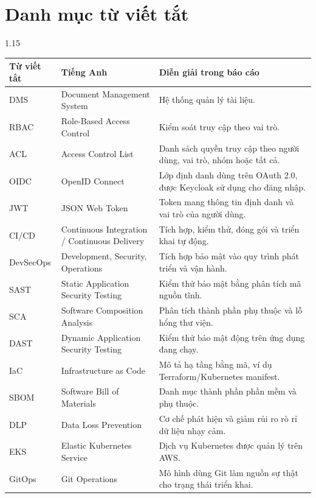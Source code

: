 \chapter*{Danh mục từ viết tắt}

\begin{spacing}{1.15}
\small
\begingroup
\renewcommand{\arraystretch}{1.22}
\begin{longtable}{p{}p{}p{}}
\toprule
\textbf{Từ viết tắt} & \textbf{Tiếng Anh} & \textbf{Diễn giải trong báo cáo} \\
\midrule
DMS & Document Management System & Hệ thống quản lý tài liệu. \\
RBAC & Role-Based Access Control & Kiểm soát truy cập theo vai trò. \\
ACL & Access Control List & Danh sách quyền truy cập theo người dùng, vai trò, nhóm hoặc tất cả. \\
OIDC & OpenID Connect & Lớp định danh dùng trên OAuth 2.0, được Keycloak sử dụng cho đăng nhập. \\
JWT & JSON Web Token & Token mang thông tin định danh và vai trò của người dùng. \\
CI/CD & Continuous Integration / Continuous Delivery & Tích hợp, kiểm thử, đóng gói và triển khai tự động. \\
DevSecOps & Development, Security, Operations & Tích hợp bảo mật vào quy trình phát triển và vận hành. \\
SAST & Static Application Security Testing & Kiểm thử bảo mật bằng phân tích mã nguồn tĩnh. \\
SCA & Software Composition Analysis & Phân tích thành phần phụ thuộc và lỗ hổng thư viện. \\
DAST & Dynamic Application Security Testing & Kiểm thử bảo mật động trên ứng dụng đang chạy. \\
IaC & Infrastructure as Code & Mô tả hạ tầng bằng mã, ví dụ Terraform/Kubernetes manifest. \\
SBOM & Software Bill of Materials & Danh mục thành phần phần mềm và phụ thuộc. \\
DLP & Data Loss Prevention & Cơ chế phát hiện và giảm rủi ro rò rỉ dữ liệu nhạy cảm. \\
EKS & Elastic Kubernetes Service & Dịch vụ Kubernetes được quản lý trên AWS. \\
GitOps & Git Operations & Mô hình dùng Git làm nguồn sự thật cho trạng thái triển khai. \\

\end{longtable}
\end{spacing}
